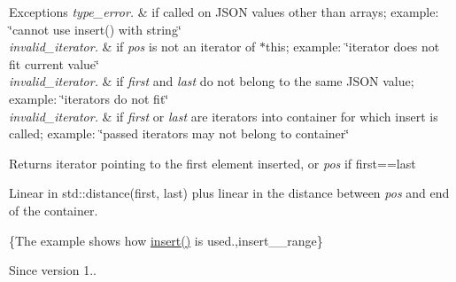 \begin{DoxyExceptions}{Exceptions}
{\em type\+\_\+error.} & if called on J\+S\+ON values other than arrays; example\+: {\ttfamily \char`\"{}cannot use insert() with string\char`\"{}} \\
\hline
{\em invalid\+\_\+iterator.} & if {\itshape pos} is not an iterator of $\ast$this; example\+: {\ttfamily \char`\"{}iterator does not fit current value\char`\"{}} \\
\hline
{\em invalid\+\_\+iterator.} & if {\itshape first} and {\itshape last} do not belong to the same J\+S\+ON value; example\+: {\ttfamily \char`\"{}iterators do not fit\char`\"{}} \\
\hline
{\em invalid\+\_\+iterator.} & if {\itshape first} or {\itshape last} are iterators into container for which insert is called; example\+: {\ttfamily \char`\"{}passed iterators may not
belong to container\char`\"{}}\\
\hline
\end{DoxyExceptions}
\begin{DoxyReturn}{Returns}
iterator pointing to the first element inserted, or {\itshape pos} if {\ttfamily first==last}
\end{DoxyReturn}
Linear in {\ttfamily std\+::distance(first, last)} plus linear in the distance between {\itshape pos} and end of the container.

\{The example shows how {\ttfamily \mbox{\hyperlink{classnlohmann_1_1basic__json_a0136728f5db69d4051c77b94307abd6c}{insert()}}} is used.,insert\+\_\+\+\_\+range\}

\begin{DoxySince}{Since}
version 1.. 
\end{DoxySince}
\mbox{\label{classnlohmann_1_1basic__json_aa19b9b9ca6967295b102f1cc487b1ad7}} 

